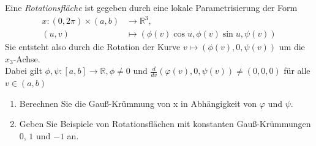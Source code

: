 \begin{assignment}
Eine \emph{Rotationsfläche} ist gegeben durch eine lokale Parametrisierung der Form
  \begin{align*}
    x:(0,2\pi) \times (a,b) &\to \mathbb{R}^3, \\
    (u,v) &\mapsto (\phi(v)\cos u, \phi(v)\sin u, \psi(v))
  \end{align*}
  Sie entsteht also durch die Rotation der Kurve \( v \mapsto (\phi(v), 0, \psi(v)) \) um die \( x_3 \)-Achse. \\
  Dabei gilt \( \phi, \psi: [a,b] \to \mathbb{R}, \phi \neq 0 \) und $\frac{d}{dv}(\varphi(v), 0, \psi(v)) \neq (0,0,0)$ für alle $v \in (a,b)$ 
  \begin{enumerate}[label=(\alph*)] 
   \item Berechnen Sie die Gauß-Krümmung von x in Abhängigkeit von $\varphi$ und $\psi$. 
   \item Geben Sie Beispiele von Rotationsflächen mit konstanten Gauß-Krümmungen $0$, $1$ und $-1$ an.
  \end{enumerate}
\end{assignment}
